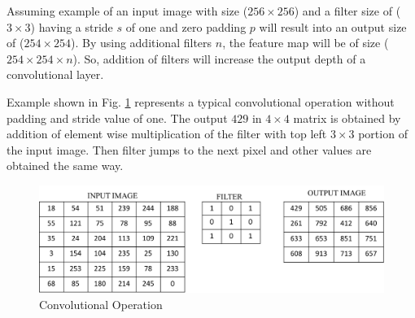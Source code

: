 \documentclass[11pt]{article}
\begin{document}
Assuming example of an input image with size ($256 \times 256$) and a filter size of ($3 \times 3$) having a stride $s$ of one and zero padding $p$ will result into an output size of ($254 \times 254$). By using additional filters $n$, the feature map will be of size ($254 \times 254 \times n$). So, addition of filters will increase the output depth of a convolutional layer.

Example shown in Fig. \ref{fig:Convolutional Operation} represents a typical convolutional operation without padding and stride value of one. The output $429$ in $4 \times 4$ matrix is obtained by addition of element wise multiplication of the filter with top left $3 \times 3$ portion of the input image. Then filter jumps to the next pixel and other values are obtained the same way.

\begin{figure}[H]
	\centering
	\includegraphics[width=.6\linewidth]{files/cnn_architecture/conv.png}
	\caption{Convolutional Operation}
	\label{fig:Convolutional Operation}
\end{figure}

\end{document}
